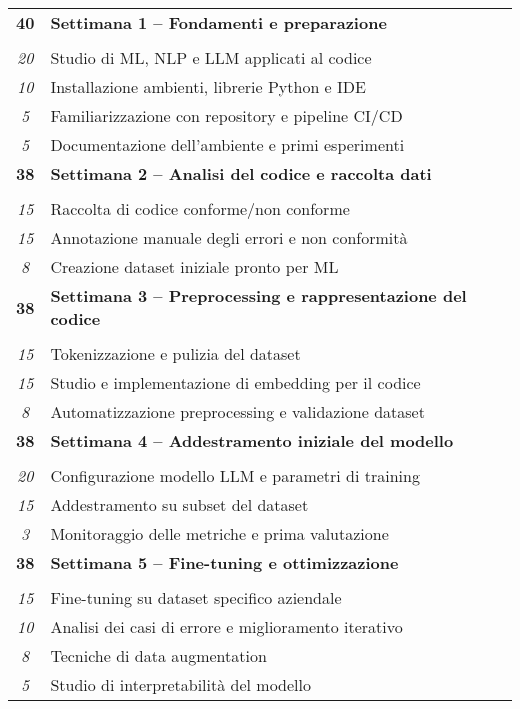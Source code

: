 

\begin{tabularx}{\textwidth}{|c|X|}
	\hline
	\textbf{40} & \textbf{Settimana 1 – Fondamenti e preparazione} \\ \hdashline
\multirow{4}{0cm}\\
\textit{20} & Studio di ML, NLP e LLM applicati al codice \\
\textit{10} & Installazione ambienti, librerie Python e IDE \\
\textit{5} & Familiarizzazione con repository e pipeline CI/CD \\
\textit{5} & Documentazione dell’ambiente e primi esperimenti \\
\hline

\textbf{38} & \textbf{Settimana 2 – Analisi del codice e raccolta dati} \\ \hdashline
\multirow{3}{0cm}\\
\textit{15} & Raccolta di codice conforme/non conforme \\
\textit{15} & Annotazione manuale degli errori e non conformità \\
\textit{8} & Creazione dataset iniziale pronto per ML \\
\hline

\textbf{38} & \textbf{Settimana 3 – Preprocessing e rappresentazione del codice} \\ \hdashline
\multirow{4}{0cm}\\
\textit{15} & Tokenizzazione e pulizia del dataset \\
\textit{15} & Studio e implementazione di embedding per il codice \\
\textit{8} & Automatizzazione preprocessing e validazione dataset \\
\hline

\textbf{38} & \textbf{Settimana 4 – Addestramento iniziale del modello} \\ \hdashline
\multirow{3}{0cm}\\
\textit{20} & Configurazione modello LLM e parametri di training \\
\textit{15} & Addestramento su subset del dataset \\
\textit{3} & Monitoraggio delle metriche e prima valutazione \\
\hline

\textbf{38} & \textbf{Settimana 5 – Fine-tuning e ottimizzazione} \\ \hdashline
\multirow{4}{0cm}\\
\textit{15} & Fine-tuning su dataset specifico aziendale \\
\textit{10} & Analisi dei casi di errore e miglioramento iterativo \\
\textit{8} & Tecniche di data augmentation \\
\textit{5} & Studio di interpretabilità del modello \\
\hline


\end{tabularx}
